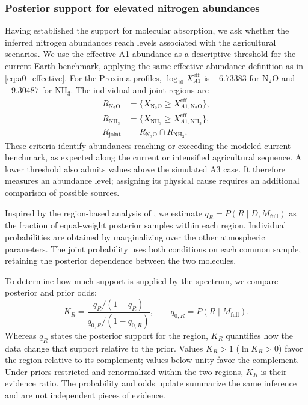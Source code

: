 \subsubsection{Posterior support for elevated nitrogen abundances}
\label{sec:life_abundance_regions}

Having established the support for molecular absorption, we ask whether the inferred nitrogen abundances reach levels associated with the agricultural scenarios. We use the effective A1 abundance as a descriptive threshold for the current-Earth benchmark, applying the same effective-abundance definition as in \autoref{eq:a0_effective}. For the Proxima profiles, $\log_{10}X^{\mathrm{eff}}_{A1}$ is $-6.73383$ for $\mathrm{N_2O}$ and $-9.30487$ for $\mathrm{NH_3}$. The individual and joint regions are
\begin{equation}
\begin{split}
R_{\mathrm{N_2O}}&=\{X_{\mathrm{N_2O}}\geq X^{\mathrm{eff}}_{A1,\mathrm{N_2O}}\},\\
R_{\mathrm{NH_3}}&=\{X_{\mathrm{NH_3}}\geq X^{\mathrm{eff}}_{A1,\mathrm{NH_3}}\},\\
R_{\mathrm{joint}}&=R_{\mathrm{N_2O}}\cap R_{\mathrm{NH_3}}.
\end{split}
\label{eq:life_regions}
\end{equation}
These criteria identify abundances reaching or exceeding the modeled current benchmark, as expected along the current or intensified agricultural sequence. A lower threshold also admits values above the simulated A3 case. It therefore measures an abundance level; assigning its physical cause requires an additional comparison of possible sources.

Inspired by the region-based analysis of \citet{woganSurfaceFluxes2026}, we estimate $q_R=P(R\mid D,M_{\mathrm{full}})$ as the fraction of equal-weight posterior samples within each region. Individual probabilities are obtained by marginalizing over the other atmospheric parameters. The joint probability uses both conditions on each common sample, retaining the posterior dependence between the two molecules.

To determine how much support is supplied by the spectrum, we compare posterior and prior odds:
\begin{equation}
K_R=\frac{q_R/(1-q_R)}{q_{0,R}/(1-q_{0,R})},
\qquad q_{0,R}=P(R\mid M_{\mathrm{full}}).
\label{eq:life_region_bayes}
\end{equation}
Whereas $q_R$ states the posterior support for the region, $K_R$ quantifies how the data change that support relative to the prior. Values $K_R>1$ ($\ln K_R>0$) favor the region relative to its complement; values below unity favor the complement. Under priors restricted and renormalized within the two regions, $K_R$ is their evidence ratio. The probability and odds update summarize the same inference and are not independent pieces of evidence.

